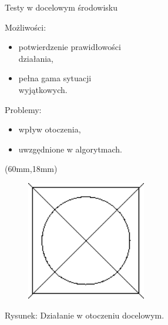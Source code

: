 \documentclass[xcolor=x11names,compress]{beamer}
\renewcommand{\(}{\begin{columns}}
\renewcommand{\)}{\end{columns}}
\newcommand{\<}[1]{\begin{column}{#1}}
\renewcommand{\>}{\end{column}}
\begin{document}
\begin{frame}{Testy w docelowym środowisku}

\alert{Możliwości:}
\begin{itemize}
\item potwierdzenie prawidłowości \\działania,
\item pełna gama sytuacji \\wyjątkowych.
\end{itemize}

\vspace{.7cm}

\alert{Problemy:}
\begin{itemize}
\item wpływ otoczenia,
\item uwzgędnione w algorytmach.
\end{itemize}

\begin{textblock*}{70mm}(60mm,18mm)%
    \begin{minipage}[c]{70mm}%
	\begin{figure}[h!]
	\includegraphics[width=5.2cm]{../Common/img/placeholder}
	\end{figure}
	\hspace{1cm}\scriptsize \alert{Rysunek:} Działanie w otoczeniu docelowym.
    \end{minipage}
\end{textblock*}

\end{frame}

\end{document}
